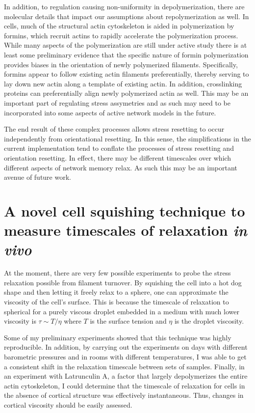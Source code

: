 In addition, to regulation causing non-uniformity in depolymerization, there are molecular details that impact our assumptions about repolymerization as well. In cells, much of the structural actin cytoskeleton is aided in polymerization by formins, which recruit actins to rapidly accelerate the polymerization process.  While many aspects of the polymerization are still under active study there is at least some preliminary evidence that the specific nature of formin polymerization provides biases in the orientation of newly polymerized filaments.  Specifically, formins appear to follow existing actin filaments preferentially, thereby serving to lay down new actin along a template of existing actin.  In addition, crosslinking proteins can preferentially align newly polymerized actin as well.  This may be an important part of regulating stress assymetries and as such may need to be incorporated into some aspects of active network models in the future.  

The end result of these complex processes allows stress resetting to occur independently from orientational resetting.  In this sense, the simplifications in the current implementation tend to conflate the processes of stress resetting and orientation resetting. In effect, there may be different timescales over which different aspects of network memory relax.  As such this may be an important avenue of future work.

\section{A novel cell squishing technique to measure timescales of relaxation \textit{in vivo}}

At the moment, there are very few possible experiments to probe the stress relaxation possible from filament turnover.  By squishing the cell into a hot dog shape and then letting it freely relax to a sphere, one can approximate the viscosity of the cell's surface.  This is because the timescale of relaxation to spherical for a purely viscous droplet embedded in a medium with much lower viscosity is $\tau \sim T/\eta$ where $T$ is the surface tension and $\eta$ is the droplet viscosity.  

Some of my preliminary experiments showed that this technique was highly reproducible.  In addition, by carrying out the experiments on days with different barometric pressures and in rooms with different temperatures, I was able to get a consistent shift in the relaxation timescale between sets of samples.  Finally, in an experiment with Latrunculin A, a factor that largely depolymerizes the entire actin cytoskeleton, I could determine that the timescale of relaxation for cells in the absence of cortical structure was effectively instantaneous.  Thus, changes in cortical viscosity should be easily assessed.  

